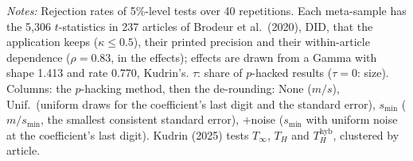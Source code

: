 \begin{table}[htbp]
\par\smallskip
\begin{minipage}{\linewidth}\footnotesize\textit{Notes:} Rejection rates of 5\%-level tests over 40 repetitions. Each meta-sample has the 5{,}306 $t$-statistics in 237 articles of Brodeur et al.\ (2020), DID, that the application keeps ($\kappa \le 0.5$), their printed precision and their within-article dependence ($\rho = 0.83$, in the effects); effects are drawn from a Gamma with shape 1.413 and rate 0.770, Kudrin's. $\tau$: share of $p$-hacked results ($\tau = 0$: size). Columns: the $p$-hacking method, then the de-rounding: None ($m/s$), Unif.\ (uniform draws for the coefficient's last digit and the standard error), $s_{\min}$ ($m/s_{\min}$, the smallest consistent standard error), $+$noise ($s_{\min}$ with uniform noise at the coefficient's last digit). Kudrin (2025) tests $T_\infty$, $T_H$ and $T_H^{\mathrm{hyb}}$, clustered by article.\end{minipage}
\end{table}
